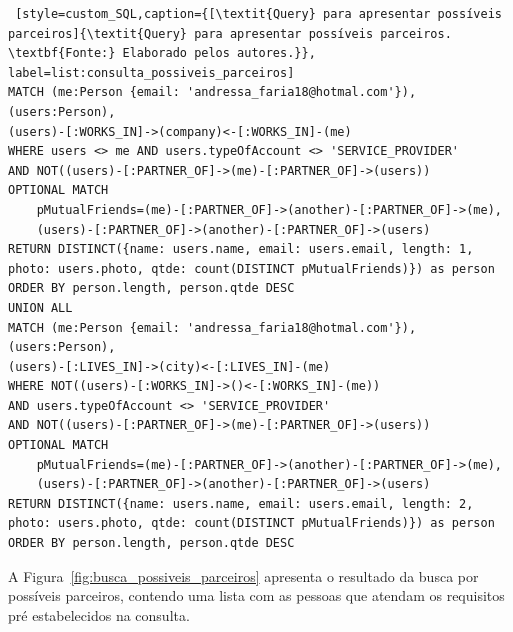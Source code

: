 \begin{lstlisting} [style=custom_SQL,caption={[\textit{Query} para apresentar possíveis parceiros]{\textit{Query} para apresentar possíveis parceiros. \textbf{Fonte:} Elaborado pelos autores.}}, label=list:consulta_possiveis_parceiros] 	
MATCH (me:Person {email: 'andressa_faria18@hotmal.com'}), (users:Person),
(users)-[:WORKS_IN]->(company)<-[:WORKS_IN]-(me)
WHERE users <> me AND users.typeOfAccount <> 'SERVICE_PROVIDER'
AND NOT((users)-[:PARTNER_OF]->(me)-[:PARTNER_OF]->(users)) 
OPTIONAL MATCH
	pMutualFriends=(me)-[:PARTNER_OF]->(another)-[:PARTNER_OF]->(me),
	(users)-[:PARTNER_OF]->(another)-[:PARTNER_OF]->(users)
RETURN DISTINCT({name: users.name, email: users.email, length: 1, 
photo: users.photo, qtde: count(DISTINCT pMutualFriends)}) as person
ORDER BY person.length, person.qtde DESC
UNION ALL
MATCH (me:Person {email: 'andressa_faria18@hotmal.com'}), (users:Person),
(users)-[:LIVES_IN]->(city)<-[:LIVES_IN]-(me)
WHERE NOT((users)-[:WORKS_IN]->()<-[:WORKS_IN]-(me))
AND users.typeOfAccount <> 'SERVICE_PROVIDER'
AND NOT((users)-[:PARTNER_OF]->(me)-[:PARTNER_OF]->(users))
OPTIONAL MATCH 
	pMutualFriends=(me)-[:PARTNER_OF]->(another)-[:PARTNER_OF]->(me),
	(users)-[:PARTNER_OF]->(another)-[:PARTNER_OF]->(users)
RETURN DISTINCT({name: users.name, email: users.email, length: 2, 
photo: users.photo, qtde: count(DISTINCT pMutualFriends)}) as person
ORDER BY person.length, person.qtde DESC
\end{lstlisting}


\par A Figura~\ref{fig:busca_possiveis_parceiros} apresenta o resultado da busca por possíveis parceiros, contendo uma lista com as pessoas que atendam os requisitos pré estabelecidos na consulta.

